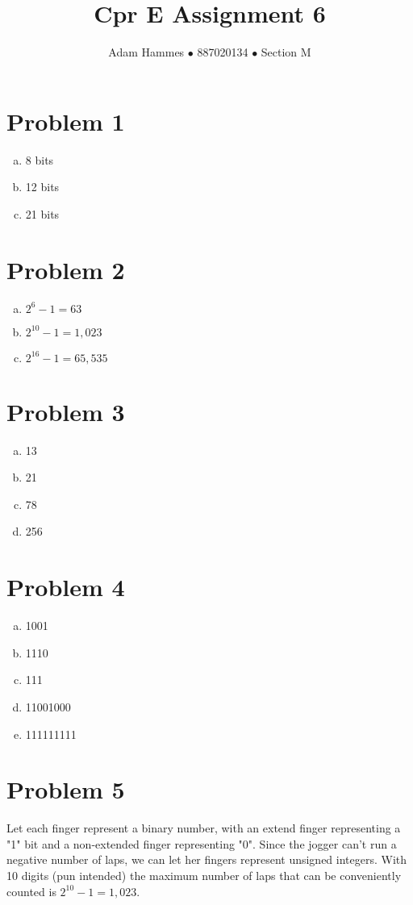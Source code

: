 \documentclass[11pt]{article}
\begin{document}
\title{Cpr E Assignment 6}
\author{Adam Hammes $\bullet$ 887020134 $\bullet$ Section M}
\maketitle

\section*{Problem 1}
\begin{enumerate}[(a)]
	\item 8 bits
	\item 12 bits
	\item 21 bits
\end{enumerate}

\section*{Problem 2}
\begin{enumerate}[(a)]
	\item $2^6 -1 = 63$
	\item $2^{10} -1 = 1,023$
	\item $2^{16}-1 = 65,535$
\end{enumerate}

\section*{Problem 3}
\begin{enumerate}[(a)]
	\item 13
	\item 21
	\item 78
	\item 256
\end{enumerate}

\section*{Problem 4}
\begin{enumerate}[(a)]
	\item 1001
	\item 1110
	\item 111
	\item 11001000
	\item 111111111
\end{enumerate}

\section*{Problem 5}
Let each finger represent a binary number, with an extend finger representing a "1" bit and a non-extended finger representing "0". Since the jogger can't run a negative number of laps, we can let her fingers represent unsigned integers. With 10 digits (pun intended) the maximum number of laps that can be conveniently counted is $2^{10} -1 = 1,023$.
\end{document}
